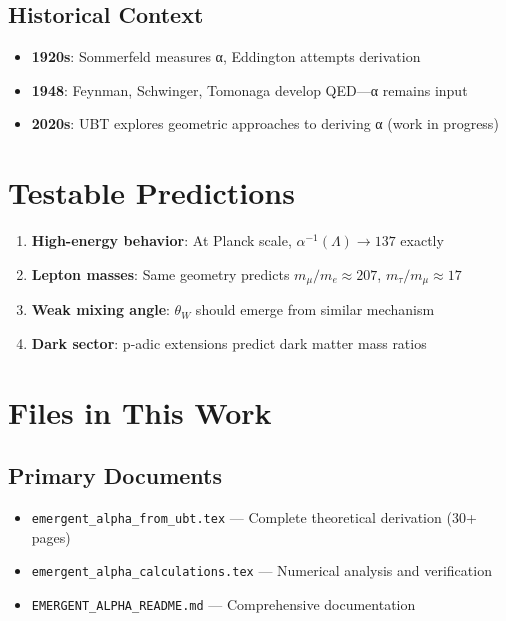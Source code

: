 \documentclass[12pt, a4paper]{article}
\begin{document}
\subsection{Historical Context}

\begin{itemize}
\item \textbf{1920s}: Sommerfeld measures α, Eddington attempts derivation
\item \textbf{1948}: Feynman, Schwinger, Tomonaga develop QED—α remains input
\item \textbf{2020s}: UBT explores geometric approaches to deriving α (work in progress)
\end{itemize}

\section{Testable Predictions}

\begin{enumerate}
\item \textbf{High-energy behavior}: At Planck scale, $\alpha^{-1}(\Lambda) \to 137$ exactly
\item \textbf{Lepton masses}: Same geometry predicts $m_\mu/m_e \approx 207$, $m_\tau/m_\mu \approx 17$
\item \textbf{Weak mixing angle}: $\theta_W$ should emerge from similar mechanism
\item \textbf{Dark sector}: p-adic extensions predict dark matter mass ratios
\end{enumerate}

\section{Files in This Work}

\subsection{Primary Documents}

\begin{itemize}
\item \texttt{emergent\_alpha\_from\_ubt.tex} — Complete theoretical derivation (30+ pages)
\item \texttt{emergent\_alpha\_calculations.tex} — Numerical analysis and verification
\item \texttt{EMERGENT\_ALPHA\_README.md} — Comprehensive documentation
\end{itemize}
\end{document}
